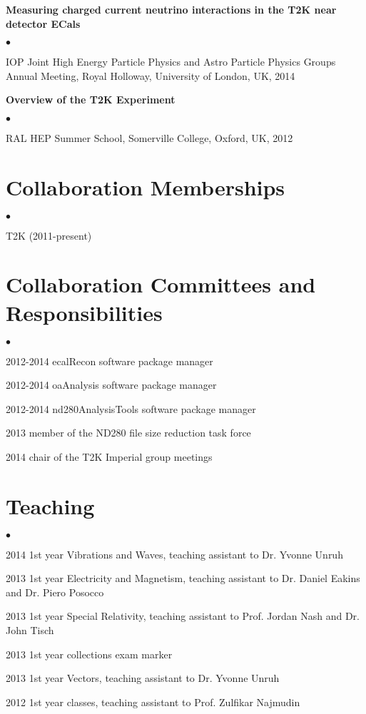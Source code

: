 \documentclass[margin,line]{res}
\newenvironment{list2}{
  \begin{list}{$\bullet$}{%
      \setlength{\itemsep}{0in}
      \setlength{\parsep}{0in} \setlength{\parskip}{0in}
      \setlength{\topsep}{0in} \setlength{\partopsep}{0in} 
      \setlength{\leftmargin}{0.2in}}}{\end{list}}
\begin{document}
\begin{resume}
{\bf Measuring charged current neutrino interactions in the T2K near detector ECals}
\begin{list2}
\item IOP Joint High Energy Particle Physics and Astro Particle Physics Groups Annual Meeting, Royal Holloway, University of London, UK, 2014
\end{list2}

{\bf Overview of the T2K Experiment}
\begin{list2}
\item RAL HEP Summer School, Somerville College, Oxford, UK, 2012
\end{list2}

\section{\sc Collaboration Memberships} 
\begin{list2}
\item T2K (2011-present)


\end{list2}

\section{\sc Collaboration Committees and Responsibilities} 
\begin{list2}
\item 2012-2014 ecalRecon software package manager
\item 2012-2014 oaAnalysis software package manager
\item 2012-2014 nd280AnalysisTools software package manager
\item 2013 member of the ND280 file size reduction task force
\item 2014 chair of the T2K Imperial group meetings


\end{list2}

\section{\sc Teaching }
\begin{list2}
\item 2014 1st year Vibrations and Waves, teaching assistant to Dr. Yvonne Unruh
\item 2013 1st year Electricity and Magnetism, teaching assistant to Dr. Daniel Eakins and Dr. Piero Posocco
\item 2013 1st year Special Relativity, teaching assistant to Prof. Jordan Nash and Dr. John Tisch
\item 2013 1st year collections exam marker
\item 2013 1st year Vectors, teaching assistant to Dr. Yvonne Unruh
\item 2012 1st year classes, teaching assistant to Prof. Zulfikar Najmudin


\end{list2}
\end{resume}
\end{document}
